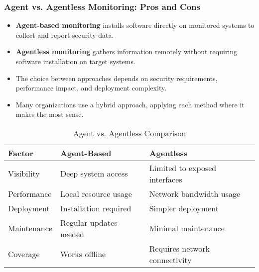 \documentclass{beamer}
\begin{document}
    \begin{frame}
    \frametitle{Agent vs. Agentless Monitoring: Pros and Cons}
    \begin{itemize}
    \item \textbf{Agent-based monitoring} installs software directly on monitored systems to collect and report security data.
    \item \textbf{Agentless monitoring} gathers information remotely without requiring software installation on target systems.
    \item The choice between approaches depends on security requirements, performance impact, and deployment complexity.
    \item Many organizations use a hybrid approach, applying each method where it makes the most sense.
    \end{itemize}
    
    \begin{table}
    \begin{tabular}{lll}
    \scriptsize
    \toprule
    \textbf{Factor} & \textbf{Agent-Based} & \textbf{Agentless} \\
    \midrule
    Visibility & Deep system access & Limited to exposed interfaces \\
    Performance & Local resource usage & Network bandwidth usage \\
    Deployment & Installation required & Simpler deployment \\
    Maintenance & Regular updates needed & Minimal maintenance \\
    Coverage & Works offline & Requires network connectivity \\
    \bottomrule
    \end{tabular}
    \caption{Agent vs. Agentless Comparison}
    \end{table}
    \end{frame}

    
\end{document}
